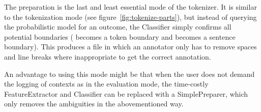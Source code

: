 The preparation is the last and least essential mode of the tokenizer. It is
similar to the tokenization mode (see figure~\ref{fig:tokenize-parts}), but
instead of querying the probabilistic model for an outcome, the Classifier
simply confirms all potential boundaries (\maysplit{} becomes a token boundary
and \maybreaksentence{} becomes a sentence boundary). This produces a file in
which an annotator only has to remove spaces and line breaks where
inappropriate to get the correct annotation.

An advantage to using this mode might be that when the user does not demand the
logging of contexts as in the evaluation mode, the time-costly FeatureExtractor
and Classifier can be replaced with a SimplePreparer, which only removes the
ambiguities in the abovementioned way.
